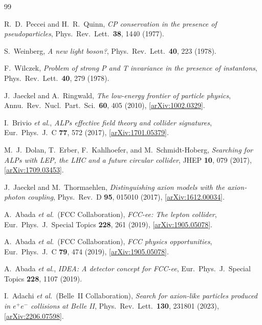 \documentclass[12pt,a4paper]{article}
\begin{document}

\begin{thebibliography}{99}

R.~D.~Peccei and H.~R.~Quinn,
\textit{CP conservation in the presence of pseudoparticles},
Phys.\ Rev.\ Lett.\ \textbf{38}, 1440 (1977).

S.~Weinberg,
\textit{A new light boson?},
Phys.\ Rev.\ Lett.\ \textbf{40}, 223 (1978).

F.~Wilczek,
\textit{Problem of strong P and T invariance in the presence of instantons},
Phys.\ Rev.\ Lett.\ \textbf{40}, 279 (1978).

J.~Jaeckel and A.~Ringwald,
\textit{The low-energy frontier of particle physics},
Annu.\ Rev.\ Nucl.\ Part.\ Sci.\ \textbf{60}, 405 (2010),
[\href{https://arxiv.org/abs/1002.0329}{arXiv:1002.0329}].

I.~Brivio \textit{et al.},
\textit{ALPs effective field theory and collider signatures},
Eur.\ Phys.\ J.\ C \textbf{77}, 572 (2017),
[\href{https://arxiv.org/abs/1701.05379}{arXiv:1701.05379}].

M.~J.~Dolan, T.~Erber, F.~Kahlhoefer, and M.~Schmidt-Hoberg,
\textit{Searching for ALPs with LEP, the LHC and a future circular collider},
JHEP \textbf{10}, 079 (2017),
[\href{https://arxiv.org/abs/1709.03453}{arXiv:1709.03453}].

J.~Jaeckel and M.~Thormaehlen,
\textit{Distinguishing axion models with the axion-photon coupling},
Phys.\ Rev.\ D \textbf{95}, 015010 (2017),
[\href{https://arxiv.org/abs/1612.00034}{arXiv:1612.00034}].

A.~Abada \textit{et al.}\ (FCC Collaboration),
\textit{FCC-ee: The lepton collider},
Eur.\ Phys.\ J.\ Special Topics \textbf{228}, 261 (2019),
[\href{https://arxiv.org/abs/1905.05078}{arXiv:1905.05078}].

A.~Abada \textit{et al.}\ (FCC Collaboration),
\textit{FCC physics opportunities},
Eur.\ Phys.\ J.\ C \textbf{79}, 474 (2019),
[\href{https://arxiv.org/abs/1905.05078}{arXiv:1905.05078}].

A.~Abada \textit{et al.},
\textit{IDEA: A detector concept for FCC-ee},
Eur.\ Phys.\ J.\ Special Topics \textbf{228}, 1107 (2019).

I.~Adachi \textit{et al.}\ (Belle~II Collaboration),
\textit{Search for axion-like particles produced in $e^+e^-$ collisions at Belle II},
Phys.\ Rev.\ Lett.\ \textbf{130}, 231801 (2023),
[\href{https://arxiv.org/abs/2206.07598}{arXiv:2206.07598}].


\end{thebibliography}
\end{document}
